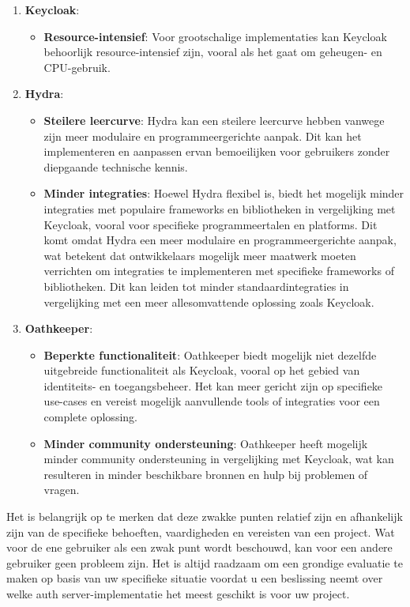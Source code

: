 \begin{enumerate}[label=\textbf{\arabic*.}]
    \item \textbf{Keycloak}:
    \begin{itemize}
        \item \textbf{Resource-intensief}: Voor grootschalige implementaties kan Keycloak behoorlijk resource-intensief zijn, vooral als het gaat om geheugen- en CPU-gebruik.
    \end{itemize}

    \item \textbf{Hydra}:
    \begin{itemize}
        \item \textbf{Steilere leercurve}: Hydra kan een steilere leercurve hebben vanwege zijn meer modulaire en programmeergerichte aanpak. Dit kan het implementeren en aanpassen ervan bemoeilijken voor gebruikers zonder diepgaande technische kennis.
        \item \textbf{Minder integraties}: Hoewel Hydra flexibel is, biedt het mogelijk minder integraties met populaire frameworks en bibliotheken in vergelijking met Keycloak, vooral voor specifieke programmeertalen en platforms. Dit komt omdat Hydra een meer modulaire en programmeergerichte aanpak, wat betekent dat ontwikkelaars mogelijk meer maatwerk moeten verrichten om integraties te implementeren met specifieke frameworks of bibliotheken. Dit kan leiden tot minder standaardintegraties in vergelijking met een meer allesomvattende oplossing zoals Keycloak.
    \end{itemize}
    
    \item \textbf{Oathkeeper}:
    \begin{itemize}
        \item \textbf{Beperkte functionaliteit}: Oathkeeper biedt mogelijk niet dezelfde uitgebreide functionaliteit als Keycloak, vooral op het gebied van identiteits- en toegangsbeheer. Het kan meer gericht zijn op specifieke use-cases en vereist mogelijk aanvullende tools of integraties voor een complete oplossing.
        \item \textbf{Minder community ondersteuning}: Oathkeeper heeft mogelijk minder community ondersteuning in vergelijking met Keycloak, wat kan resulteren in minder beschikbare bronnen en hulp bij problemen of vragen.
    \end{itemize}
\end{enumerate}

Het is belangrijk op te merken dat deze zwakke punten relatief zijn en afhankelijk zijn van de specifieke behoeften, vaardigheden en vereisten van een project. Wat voor de ene gebruiker als een zwak punt wordt beschouwd, kan voor een andere gebruiker geen probleem zijn. Het is altijd raadzaam om een grondige evaluatie te maken op basis van uw specifieke situatie voordat u een beslissing neemt over welke auth server-implementatie het meest geschikt is voor uw project.

